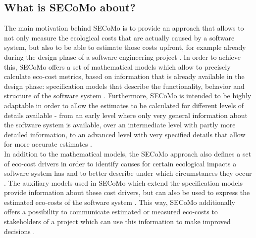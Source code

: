 \documentclass[oribibl]{llncs}
\begin{document}
\subsection{What is SECoMo about?} %
The main motivation behind SECoMo is to provide an approach that allows to not only measure the ecological costs that are actually caused by a software system, but also to be able to estimate those costs upfront, for example already during the design phase of a software engineering project \cite{schulze_cost_2016}. %
In order to achieve this, SECoMo offers a set of mathematical models which allow to precisely calculate eco-cost metrics, based on information that is already available in the design phase: specification models %
that describe the functionality, behavior and structure of the software system \cite{schulze_cost_2016}. Furthermore, SECoMo is intended to be highly adaptable %
in order to allow the estimates to be calculated for different levels of details available - from an early level where only very general information about the software system is available, over an intermediate level with partly more detailed information, to an advanced level with very specified details that allow for more accurate estimates \cite{schulze_cost_2016}.\\ %
In addition to the mathematical models, the SECoMo approach also defines a set of eco-cost drivers in order to identify causes for certain ecological impacts a software system has and to better describe under which circumstances they occur \cite{schulze_cost_2016}. The auxiliary models used in SECoMo which extend the specification models %
provide information about these cost drivers, but can also be used to express the estimated eco-costs of the software system \cite{schulze_cost_2016}. This way, SECoMo additionally offers a possibility to communicate estimated or measured eco-costs to stakeholders of a project which can use this information to make improved decisions \cite{schulze_cost_2016}.\\ %
\end{document}
